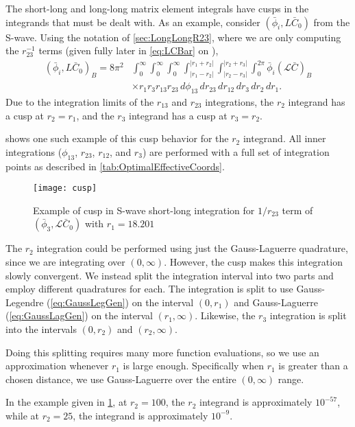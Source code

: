 \documentclass[Dissertation.tex]{subfiles}
\begin{document}
The short-long and long-long matrix element integrals have cusps in the integrands that must be dealt with. As an example, consider $(\bar{\phi}_i, L\bar{C}_0)$ from the S-wave. Using the notation of \cref{sec:LongLongR23}, where we are only computing the $r_{23}^{-1}$ terms (given fully later in \cref{eq:LCBar} on \pageref{eq:LCBar}),
\begin{align}
(\bar{\phi}_i, L\bar{C}_0)_B = 8\pi^2 & \int_0^\infty \int_0^\infty \int_0^\infty \int_{|r_1 - r_2|}^{|r_1 + r_2|} \int_{|r_2 - r_3|}^{|r_2 + r_3|} \int_0^{2\pi} \bar{\phi}_i (\mathcal{L} \bar{C})_B  \nonumber \\
& \times r_1 r_3 r_{13} r_{23}\, d\phi_{13}\, dr_{23}\, dr_{12}\, dr_3\, dr_2\, dr_1.
\end{align}
Due to the integration limits of the $r_{13}$ and $r_{23}$ integrations, the $r_2$ integrand has a cusp at $r_2 = r_1$, and the $r_3$ integrand has a cusp at $r_3 = r_2$.

 shows one such example of this cusp behavior for the $r_2$ integrand. All inner integrations ($\phi_{13}$, $r_{23}$, $r_{12}$, and $r_3$) are performed with a full set of integration points as described in \cref{tab:OptimalEffectiveCoords}.

\begin{figure}[H]
	\centering
	\texttt{[image: cusp]}
	\caption{Example of cusp in S-wave short-long integration for $1/r_{23}$ term of $(\bar{\phi}_3, \mathcal{L}\bar{C}_0)$ with \mbox{$r_1 = 18.201$}}
	\label{fig:cusp}
\end{figure}

The $r_2$ integration could be performed using just the Gauss-Laguerre quadrature, since we are integrating over $(0,\infty)$. However, the cusp makes this integration slowly convergent. We instead split the integration interval into two parts and employ different quadratures for each. The integration is split to use Gauss-Legendre (\cref{eq:GaussLegGen}) on the interval $(0,r_1)$ and Gauss-Laguerre (\cref{eq:GaussLagGen}) on the interval $(r_1,\infty)$. Likewise, the $r_3$ integration is split into the intervals $(0,r_2)$ and $(r_2,\infty)$.

Doing this splitting requires many more function evaluations, so we use an approximation whenever $r_1$ is large enough. Specifically when $r_1$ is greater than a chosen distance, we use Gauss-Laguerre over the entire $(0,\infty)$ range. 



In the example given in \cref{fig:cusp}, at $r_2 = 100$, the $r_2$ integrand is approximately $10^{-57}$, while at $r_2 = 25$, the integrand is approximately $10^{-9}$.
\end{document}
